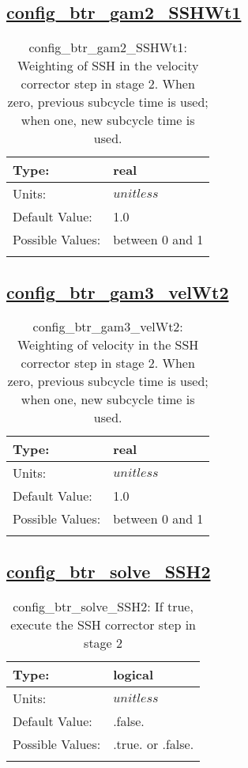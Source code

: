 \subsection[config\_btr\_gam2\_SSHWt1]{\hyperref[sec:nm_tab_split_explicit_ts]{config\_btr\_gam2\_SSHWt1}}
\label{subsec:nm_sec_config_btr_gam2_SSHWt1}
\begin{center}
\begin{longtable}{| p{2.0in} | p{4.0in} |}
    \hline
    Type: & real \\
    \hline
    Units: & $unitless$ \\
    \hline
    Default Value: & 1.0 \\
    \hline
    Possible Values: & between 0 and 1 \\
    \hline
    \caption{config\_btr\_gam2\_SSHWt1: Weighting of SSH in the velocity corrector step in stage 2.  When zero, previous subcycle time is used; when one, new subcycle time is used.}
\end{longtable}
\end{center}
\subsection[config\_btr\_gam3\_velWt2]{\hyperref[sec:nm_tab_split_explicit_ts]{config\_btr\_gam3\_velWt2}}
\label{subsec:nm_sec_config_btr_gam3_velWt2}
\begin{center}
\begin{longtable}{| p{2.0in} | p{4.0in} |}
    \hline
    Type: & real \\
    \hline
    Units: & $unitless$ \\
    \hline
    Default Value: & 1.0 \\
    \hline
    Possible Values: & between 0 and 1 \\
    \hline
    \caption{config\_btr\_gam3\_velWt2: Weighting of velocity in the SSH corrector step in stage 2.  When zero, previous subcycle time is used; when one, new subcycle time is used.}
\end{longtable}
\end{center}
\subsection[config\_btr\_solve\_SSH2]{\hyperref[sec:nm_tab_split_explicit_ts]{config\_btr\_solve\_SSH2}}
\label{subsec:nm_sec_config_btr_solve_SSH2}
\begin{center}
\begin{longtable}{| p{2.0in} | p{4.0in} |}
    \hline
    Type: & logical \\
    \hline
    Units: & $unitless$ \\
    \hline
    Default Value: & .false. \\
    \hline
    Possible Values: & .true. or .false. \\
    \hline
    \caption{config\_btr\_solve\_SSH2: If true, execute the SSH corrector step in stage 2}
\end{longtable}
\end{center}
